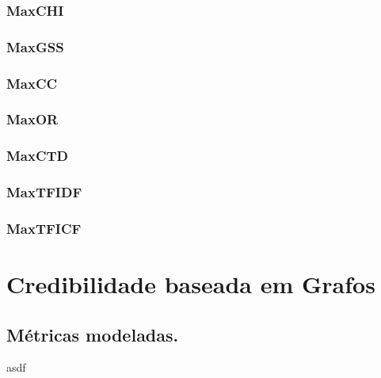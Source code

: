 \subsubsection{MaxCHI}
\label{subsubsection::maxchi}

\subsubsection{MaxGSS}
\label{subsubsection::maxgss}

\subsubsection{MaxCC}
\label{subsubsection::maxcc}

\subsubsection{MaxOR}
\label{subsubsection::maxor}

\subsubsection{MaxCTD}
\label{subsubsection::maxctd}

\subsubsection{MaxTFIDF}
\label{subsubsection::maxtfidf}

\subsubsection{MaxTFICF} 
\label{subsubsection::maxtficf}

\cite{ChihHow04}




\section{Credibilidade baseada em Grafos}
\label{sec::pg_cred_baseada_grafos}

\subsection{Métricas modeladas.}
\label{subsec::pg_metricas_grafos}

asdf

